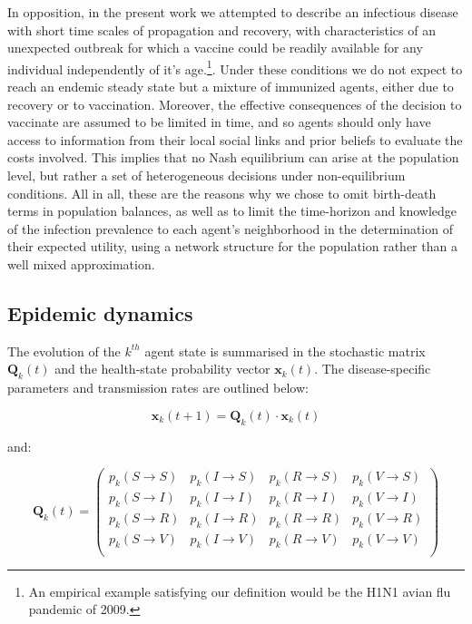 \documentclass[11pt]{article}
\begin{document}
In opposition, in the present work we attempted to describe an infectious disease with short time scales of propagation and recovery, with characteristics of an unexpected outbreak for which a vaccine could be readily available for any individual independently of it's age.\footnote{An empirical example satisfying our definition would be the H1N1 avian flu pandemic of 2009.}. Under these conditions we do not expect to reach an endemic steady state but a mixture of immunized agents, either due to recovery or to vaccination. Moreover, the effective consequences of the decision to vaccinate are assumed to be limited in time, and so agents should only have access to information from their local social links and prior beliefs to evaluate the costs involved. This implies that no Nash equilibrium can arise at the population level, but rather a set of heterogeneous decisions under non-equilibrium conditions. All in all, these are the reasons why we chose to omit birth-death terms in population balances, as well as to limit the time-horizon and knowledge of the infection prevalence to each agent's neighborhood in the determination of their expected utility, using a network structure for the population rather than a well mixed approximation.

\subsection{Epidemic dynamics}

The evolution of the $\mathit{k}^{th}$ agent state is summarised in the stochastic matrix \(\mathbf{Q}_k(t)\) and the health-state probability vector \(\mathbf{x}_k(t)\). The disease-specific parameters and transmission rates are outlined below:

\begin{equation}\label{eq:1}
	 \mathbf{x}_k(t+1) = \mathbf{Q}_k(t) \cdot \mathbf{x}_k(t)
\end{equation}

and:

\begin{equation}\label{eq:2}
	 \mathbf{Q}_k(t) = 
	 \left (\begin{array}{cccc} p_{k}(S\rightarrow{}S)&p_{k}(I\rightarrow{}S)&p_{k}(R\rightarrow{}S)&p_{k}(V\rightarrow{}S) \\
	 	p_{k}(S\rightarrow{}I)&p_{k}(I\rightarrow{}I)&p_{k}(R\rightarrow{}I)&p_{k}(V\rightarrow{}I) \\
		p_{k}(S\rightarrow{}R)&p_{k}(I\rightarrow{}R)&p_{k}(R\rightarrow{}R)&p_{k}(V\rightarrow{}R) \\
		p_{k}(S\rightarrow{}V)&p_{k}(I\rightarrow{}V)&p_{k}(R\rightarrow{}V)&p_{k}(V\rightarrow{}V) \\
	  \end{array} \right)
\end{equation}
\end{document}
